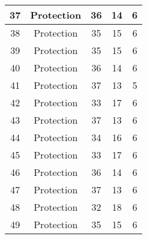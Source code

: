 \documentclass[results.tex]{subfiles}
\begin{document}
\begin{center}
\begin{tabular}{| c || c | c | c | c |}
            \hline
            37                      & Protection                   & 36                     & 14                      & 6                    \\
            \hline
            38                      & Protection                   & 35                     & 15                      & 6                    \\
            \hline
            39                      & Protection                   & 35                     & 15                      & 6                    \\
            \hline
            40                      & Protection                   & 36                     & 14                      & 6                    \\
            \hline
            41                      & Protection                   & 37                     & 13                      & 5                    \\
            \hline
            42                      & Protection                   & 33                     & 17                      & 6                    \\
            \hline
            43                      & Protection                   & 37                     & 13                      & 6                    \\
            \hline
            44                      & Protection                   & 34                     & 16                      & 6                    \\
            \hline
            45                      & Protection                   & 33                     & 17                      & 6                    \\
            \hline
            46                      & Protection                   & 36                     & 14                      & 6                    \\
            \hline
            47                      & Protection                   & 37                     & 13                      & 6                    \\
            \hline
            48                      & Protection                   & 32                     & 18                      & 6                    \\
            \hline
            49                      & Protection                   & 35                     & 15                      & 6                    \\
            \hline
        \end{tabular}
    \end{center}
\end{document}

